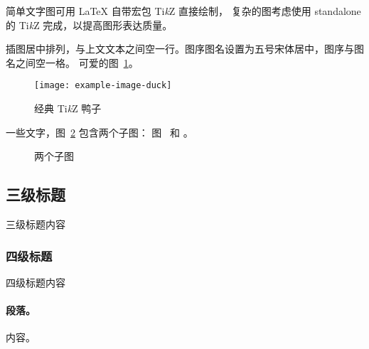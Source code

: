 \documentclass[fontset = mac ms]{seuthesis2024b}
\begin{document}
      简单文字图可用 \LaTeX{} 自带宏包 Ti\textit{k}Z 直接绘制，
      复杂的图考虑使用 standalone 的 Ti\textit{k}Z 完成，以提高图形表达质量。

      插图居中排列，与上文文本之间空一行。图序图名设置为五号宋体居中，图序与图名之间空一格。
      可爱的图~\ref{fig:duck}。

      \begin{figure}[htbp]
        \centering
        \texttt{[image: example-image-duck]}
        \caption{经典 Ti\textit{k}Z 鸭子}
        \label{fig:duck}
      \end{figure}

      一些文字，图~\ref{fig:subfigs} 包含两个子图：
      图~ 和 。

      \begin{figure}[htbp]
        \hfill
        \caption{两个子图}
        \label{fig:subfigs}
      \end{figure}

      \subsection{三级标题}
        三级标题内容
        \subsubsection{四级标题}
        四级标题内容
        \paragraph{段落。}内容。

      
    
    
\end{document}
